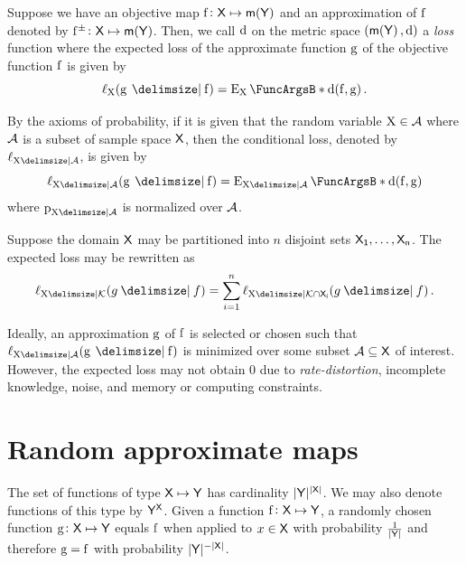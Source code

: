 \documentclass[11pt,final,hidelinks]{article}
\begin{document}
Suppose we have an objective map $\Fun{f} \colon \Set{X} \mapsto \Maybe{\Set{Y}}$ and an approximation of $\Fun{f}$ denoted by $\Fun{\AT{f}} \colon \Set{X} \mapsto \Maybe{\Set{Y}}$.
Then, we call $\Fun{d}$ on the metric space $(\Maybe{\Set{Y}},\Fun{d})$ a \emph{loss} function where the expected loss of the approximate function $\Fun{g}$ of the objective function $\Fun{f}$ is given by
\begin{equation}
\Fun{\ell}_{\RV{X}}(\Fun{g} \Given \Fun{f}) = \Expect{\Fun{d}(\Fun{f},\Fun{g})}[\RV{X}]\,.
\end{equation}

By the axioms of probability, if it is given that the random variable $\RV{X} \in \FancySet{A}$ where $\FancySet{A}$ is a subset of sample space $\Set{X}$, then the conditional loss, denoted by $\Fun{\ell}_{\RV{X} \Given \FancySet{A}}$, is given by
\begin{equation}
\Fun{\ell}_{\RV{X} \Given \FancySet{A}}(\Fun{g} \Given \Fun{f}) = \Expect{\Fun{d}(\Fun{f},\Fun{g})}[\RV{X} \Given \FancySet{A}]
\end{equation}
where $\Fun{p}_{\RV{X} \Given \FancySet{A}}$ is normalized over $\FancySet{A}$.

Suppose the domain $\PlainSet{X}$ may be partitioned into $n$ disjoint sets $\PlainSet{X}[1],\ldots,\PlainSet{X}[n]$.
The expected loss may be rewritten as
\begin{equation}
\label{eq:disj_loss}
\Fun{\ell}_{\RV{X} \Given \FancySet{K}}(g \Given f) =
\sum_{i=1}^{n} \Fun{\ell}_{\RV{X} \Given \SetIntersection[\FancySet{K}][\PlainSet{X}[i]]}(g \Given f)\,.
\end{equation}

Ideally, an approximation $\Fun{g}$ of $\Fun{f}$ is selected or chosen such that $\Fun{\ell}_{\RV{X} \Given \FancySet{A}}(\Fun{g} \Given \Fun{f})$ is minimized over some subset $\FancySet{A} \subseteq \PlainSet{X}$ of interest.
However, the expected loss may not obtain $0$ due to \emph{rate-distortion}, incomplete knowledge, noise, and memory or computing constraints.

\providecommand{\mainx}{..}
\section{Random approximate maps}
The set of functions of type $\Set{X} \mapsto \Set{Y}$ has cardinality $\Card{\Set{Y}}^{\Card{\Set{X}}}$.
We may also denote functions of this type by $\Set{Y}^{\Set{X}}$.
Given a function $\Fun{f} \colon \Set{X} \mapsto \Set{Y}$, a randomly chosen function $\Fun{g} \colon \Set{X} \mapsto \Set{Y}$ equals $\Fun{f}$ when applied to $x \in \Set{X}$ with probability $\frac{1}{\Card{\Set{Y}}}$ and therefore $\Fun{g} = \Fun{f}$ with probability $\Card{\Set{Y}}^{-\Card{\Set{X}}}$.
\end{document}
